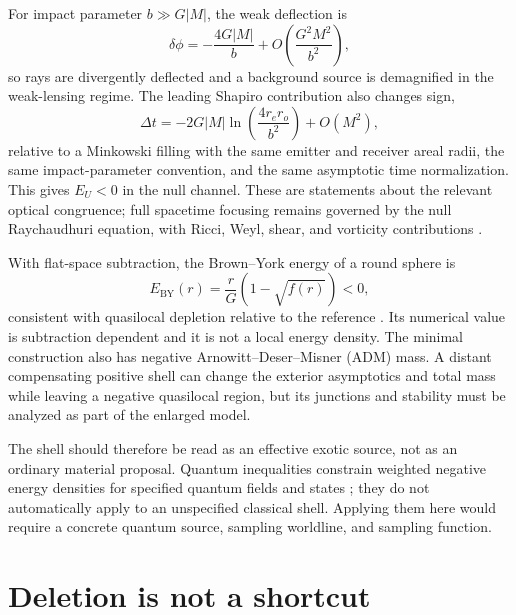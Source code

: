 \documentclass[aps,prd,twocolumn,amsmath,amssymb,nofootinbib]{revtex4-2}
\newcommand{\BY}{\mathrm{BY}}
\begin{document}
For impact parameter $b\gg G|M|$, the weak deflection is
\begin{equation}
 \delta\phi=-\frac{4G|M|}{b}
 +O\!\left(\frac{G^2M^2}{b^2}\right),
 \label{eq:deflection}
\end{equation}
so rays are divergently deflected and a background source is demagnified in
the weak-lensing regime.  The leading Shapiro contribution also changes sign,
\begin{equation}
 \Delta t=-2G|M|\ln\!\left(\frac{4r_er_o}{b^2}\right)
 +O(M^2),
 \label{eq:shapiroadvance}
\end{equation}
relative to a Minkowski filling with the same emitter and receiver areal radii,
the same impact-parameter convention, and the same asymptotic time
normalization.  This gives $E_U<0$ in the null channel.  These are statements
about the relevant optical congruence; full
spacetime focusing remains governed by the null Raychaudhuri equation, with
Ricci, Weyl, shear, and vorticity contributions \cite{wald-1984}.

With flat-space subtraction, the Brown--York energy of a round sphere is
\begin{equation}
 E_{\BY}(r)=\frac{r}{G}\left(1-\sqrt{f(r)}\right)<0,
 \label{eq:brown-york}
\end{equation}
consistent with quasilocal depletion relative to the reference
\cite{brown-york-1993}.  Its numerical value is subtraction dependent and it
is not a local energy density.  The minimal construction also has negative
Arnowitt--Deser--Misner (ADM) mass.
A distant compensating positive shell can change the exterior asymptotics and
total mass while leaving a negative quasilocal region, but its junctions and
stability must be analyzed as part of the enlarged model.

The shell should therefore be read as an effective exotic source, not as an
ordinary material proposal.  Quantum inequalities constrain weighted negative
energy densities for specified quantum fields and states
\cite{ford-roman-1995}; they do not automatically apply to an unspecified
classical shell.  Applying them here would require a concrete quantum source,
sampling worldline, and sampling function.

\section{Deletion is not a shortcut}
\label{sec:connectivity}
\end{document}
